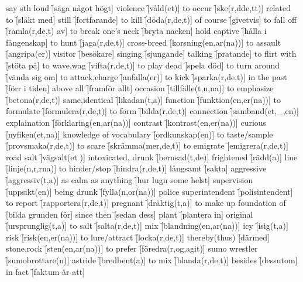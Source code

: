 \begin{questions}
\begin{multicols}{2}
        \question say sth loud \f[säga något högt]
        \question violence \f[våld(et)]
        \question to occur \f[ske(r,dde,tt)]
        \question related to \f[släkt med]
        \question still \f[fortfarande]
        \question to kill \f[döda(r,de,t)]
        \question of course \f[givetvis]
        \question to fall off \f[ramla(r,de,t) av]
        \question to break one's neck \f[bryta nacken]
        \question hold captive \f[hålla i fångenskap]
        \question to hunt \f[jaga(r,de,t)]
        \question cross-breed \f[korsning(en,ar(na))]
        \question to assault \f[angripa(er)]
        \question visitor \f[besökare]
        \question singing \f[sjungande]
        \question talking \f[pratande]
        \question to flirt with \f[stöta på]
        \question to wave,wag \f[vifta(r,de,t)]
        \question to play dead \f[spela död]
        \question to turn around \f[vända sig om]
        \question to attack,charge \f[anfalla(er)]
        \question to kick \f[sparka(r,de,t)]
        \question in the past \f[förr i tiden]
        \question above all \f[framför allt]
        \question occasion \f[tillfälle(t,n,na)]
        \question to emphasize \f[betona(r,de,t)]
        \question same,identical \f[likadan(t,a)]
        \question function \f[funktion(en,er(na))]
        \question to formulate \f[formulera(r,de,t)]
        \question to form \f[bilda(r,de,t)]
        \question connection \f[samband(et,\_,en)]
        \question explaination \f[förklaring(en,ar(na))]
        \question contrast \f[kontrast(en,er(na))]
        \question curious \f[nyfiken(et,na)]
        \question knowledge of vocabulary \f[ordkunskap(en)]
        \question to taste/sample \f[provsmaka(r,de,t)]
        \question to scare \f[skrämma(mer,de,t)]
        \question to emigrate \f[emigrera(r,de,t)]
        \question road salt \f[vägsalt(et )]
        \question intoxicated, drunk \f[berusad(t,de)]
        \question frightened \f[rädd(a)]
        \question line \f[linje(n,r,rna)]
        \question to hinder/stop \f[hindra(r,de,t)]
        \question långsamt \f[sakta]
        \question aggressive \f[aggressiv(t,a)]
        \question as calm as anything \f[hur lugn some helst]
        \question supervision \f[uppsikt(en)]
        \question being drunk \f[fylla(n,or(na))]
        \question police superintendent \f[polisintendent]
        \question to report \f[rapportera(r,de,t)]
        \question pregnant \f[dräktig(t,a)]
        \question to make up foundation of \f[bilda grunden för]
        \question since then \f[sedan dess]
        \question plant \f[plantera in]
        \question original \f[ursprunglig(t,a)]
        \question to salt \f[salta(r,de,t)]
        \question mix \f[blandning(en,ar(na))]
        \question icy \f[isig(t,a)]
        \question risk \f[risk(en,er(na))]
        \question to lure/attract \f[locka(r,de,t)]
        \question thereby(thus) \f[därmed]
        \question stone,rock \f[sten(en,ar(na))]
        \question to prefer \f[föredra(r,og,agit)]
        \question sumo wrestler \f[sumobrottare(n)]
        \question astride \f[bredbent(a)]
        \question to mix \f[blanda(r,de,t)]
        \question besides \f[dessutom]
        \question in fact \f[faktum är att]
    \end{multicols}
\end{questions}
